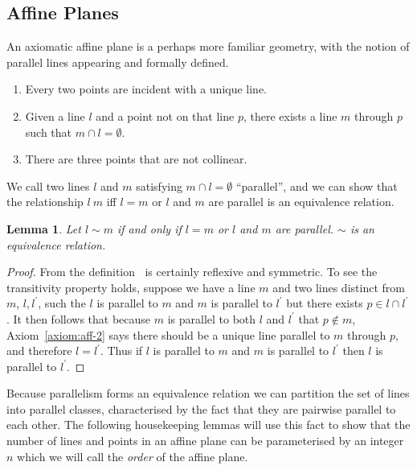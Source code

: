 \documentclass{article}
\newtheorem{lemma}{Lemma}
\begin{document}
    \subsection{Affine Planes}

    An axiomatic affine plane is a perhaps more familiar geometry, with the notion of parallel lines appearing and formally defined.

    \begin{enumerate}[label=Axiom \arabic*.]
        \item Every two points are incident with a unique line.~\label{axiom:aff-1}
        \item Given a line \(l\) and a point not on that line \(p\), there exists a line \(m\) through \(p\) such that \(m \cap l = \emptyset\).~\label{axiom:aff-2}
        \item There are three points that are not collinear.~\label{axiom:aff-3}
    \end{enumerate}

    We call two lines \(l\) and \(m\) satisfying \(m \cap l = \emptyset\) “parallel”, and we can show that the relationship \(l ~ m\) iff \(l = m\) or \(l\) and \(m\) are parallel is an equivalence relation.

    \begin{lemma}\label{lemma:parallel}
        Let \(l \sim m\) if and only if \(l = m\) or \(l\) and \(m\) are parallel. \(\sim\) is an equivalence relation.
    \end{lemma}
    \begin{proof}
      From the definition \(~\) is certainly reflexive and symmetric. To see the transitivity property holds, suppose we have a line \(m\) and two lines distinct from \(m\), \(l, l^{\prime}\), such the \(l\) is parallel to \(m\) and \(m\) is parallel to \(l^{\prime}\) but there exists \(p \in l \cap l^{\prime}\).
      It then follows that because \(m\) is parallel to both \(l\) and \(l^{\prime}\) that \(p \notin m\), Axiom~\ref{axiom:aff-2} says there should be a unique line parallel to \(m\) through \(p\), and therefore \(l = l^{\prime}\). Thus if \(l\) is parallel to \(m\) and \(m\) is parallel to \(l^{\prime}\) then \(l\) is parallel to \(l^{\prime}\).
    \end{proof}

    Because parallelism forms an equivalence relation we can partition the set of lines into parallel classes, characterised by the fact that they are pairwise parallel to each other. The following housekeeping lemmas will use this fact to show that the number of lines and points in an affine plane can be parameterised by an integer \(n\) which we will call the \textit{order} of the affine plane.
\end{document}
